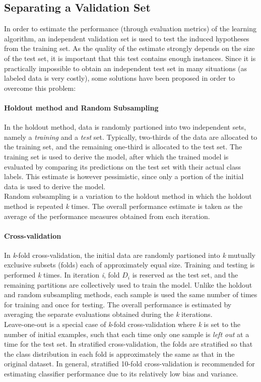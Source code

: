 \subsection{Separating a Validation Set}
In order to estimate the performance (through evaluation metrics) of the learning algorithm, an independent validation set is used to test the induced hypotheses from the training set. As the quality of the estimate strongly depends on the size of the test set, it is important that this test contains enough instances. Since it is practically impossible to obtain an independent test set in many situations (as labeled data is very costly), some solutions have been proposed in order to overcome this problem:

\paragraph{Holdout method and Random Subsampling}
In the holdout method, data is randomly partioned into two independent sets, namely a \textit{training} and a \textit{test} set. Typically, two-thirds of the data are allocated to the training set, and the remaining one-third is allocated to the test set. The training set is used to derive the model, after which the trained model is evaluated by comparing its predictions on the test set with their actual class labels. This estimate is however pessimistic, since only a portion of the initial data is used to derive the model.\\Random subsampling is a variation to the holdout method in which the holdout method is repeated \textit{k} times. The overall performance estimate is taken as the average of the performance measures obtained from each iteration.~\cite{Jiawei06}

\paragraph{Cross-validation}
In \textit{k}-fold cross-validation, the initial data are randomly partioned into \textit{k} mutually exclusive subsets (folds) each of approximately equal size. Training and testing is performed \textit{k} times. In iteration \textit{i}, fold \(D_i\) is reserved as the test set, and the remaining partitions are collectively used to train the model. Unlike the holdout and random subsampling methods, each sample is used the same number of times for training and once for testing. The overall performance is estimated by averaging the separate evaluations obtained during the \textit{k} iterations.\\Leave-one-out is a special case of \textit{k}-fold cross-validation where \textit{k} is set to the number of initial examples, such that each time only one sample is \textit{left out} at a time for the test set.
\newpage
In stratified cross-validation, the folds are stratified so that the class distribution in each fold is approximately the same as that in the original dataset. In general, stratified 10-fold cross-validation is recommended for estimating classifier performance due to its relatively low bias and variance.~\cite{Jiawei06}

